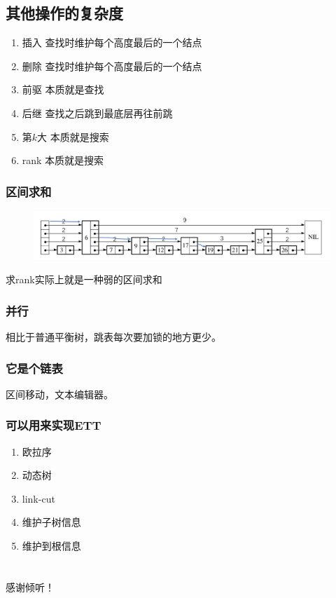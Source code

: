 \documentclass{beamer}
\begin{document}
	\subsection{其他操作的复杂度}
	\begin{frame}
		\begin{enumerate}
			\item 插入 \quad 查找时维护每个高度最后的一个结点
			\item 删除 \quad 查找时维护每个高度最后的一个结点
			\item 前驱 \quad 本质就是查找
			\item 后继 \quad 查找之后跳到最底层再往前跳
			\item 第$k$大 \quad 本质就是搜索
			\item rank \quad 本质就是搜索
		\end{enumerate}
	\end{frame}

	\begin{frame}
		\frametitle{区间求和}
		\begin{figure}[H]
			\centering
			\includegraphics[scale=0.25]{./img/rank.jpg}
		\end{figure}
		求rank实际上就是一种弱的区间求和
	\end{frame}

	\begin{frame}
		\frametitle{并行}
		相比于普通平衡树，跳表每次要加锁的地方更少。
	\end{frame}

	\begin{frame}
		\frametitle{它是个链表}
		区间移动，文本编辑器。
	\end{frame}

	\begin{frame}
		\frametitle{可以用来实现ETT}
		\begin{enumerate}
			\item 欧拉序
			\item 动态树
			\item link-cut
			\item 维护子树信息
			\item 维护到根信息
		\end{enumerate}
	\end{frame}


	\section*{}
	\begin{frame}
		感谢倾听！
	\end{frame}
\end{document}
